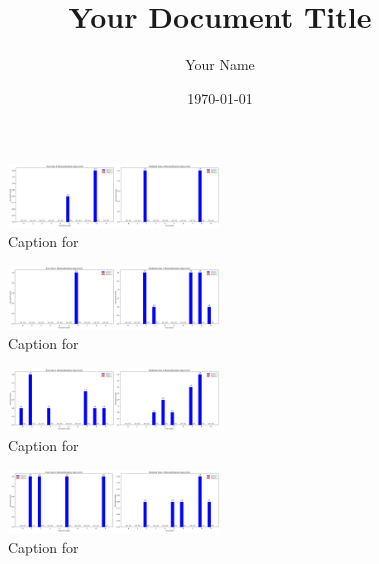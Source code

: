 \documentclass[12pt, a4paper]{article}
\title{Your Document Title}
\author{Your Name}
\date{\today} %
\begin{document}
\maketitle %



\begin{figure}[ht]
\centering
\includegraphics[width=0.5\textwidth]{combined_class_boundary_pgd/combined_class_0_misclassifications_eps_0.01.png}
\caption{Caption for }
\label{fig:combined_class_0_misclassifications_eps_0.01.png}
\end{figure}

\begin{figure}[ht]
\centering
\includegraphics[width=0.5\textwidth]{combined_class_boundary_pgd/combined_class_1_misclassifications_eps_0.01.png}
\caption{Caption for }
\label{fig:combined_class_1_misclassifications_eps_0.01.png}
\end{figure}

\begin{figure}[ht]
\centering
\includegraphics[width=0.5\textwidth]{combined_class_boundary_pgd/combined_class_2_misclassifications_eps_0.01.png}
\caption{Caption for }
\label{fig:combined_class_2_misclassifications_eps_0.01.png}
\end{figure}

\begin{figure}[ht]
\centering
\includegraphics[width=0.5\textwidth]{combined_class_boundary_pgd/combined_class_3_misclassifications_eps_0.01.png}
\caption{Caption for }
\label{fig:combined_class_3_misclassifications_eps_0.01.png}
\end{figure}
\end{document}
